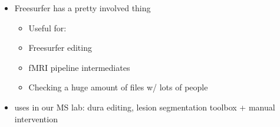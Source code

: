 \begin{itemize}

\item Freesurfer has a pretty involved thing
    \begin{itemize}
    \item Useful for:
    \item Freesurfer editing
    \item fMRI pipeline intermediates
    \item Checking a huge amount of files w/ lots of people
    \end{itemize}
\item uses in our MS lab: dura editing, lesion segmentation toolbox + manual intervention

\end{itemize}



